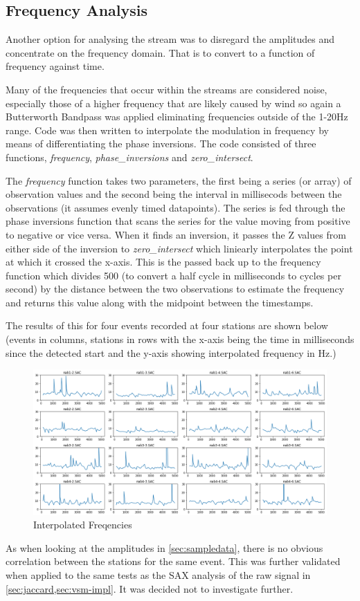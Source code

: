 \documentclass[../report.tex]{subfiles}
\begin{document}
\subsection{Frequency Analysis}
	Another option for analysing the stream was to disregard the amplitudes and concentrate on the frequency domain.  That is to convert to a function of frequency against time.
	
	Many of the frequencies that occur within the streams are considered noise, especially those of a higher frequency that are likely caused by wind so again a Butterworth Bandpass \citep{bandpass} was applied eliminating frequencies outside of the 1-20Hz range.  Code was then written to interpolate the modulation in frequency by means of differentiating the phase inversions.  The code consisted of three functions, \textit{frequency}, \textit{phase\_inversions} and \textit{zero\_intersect}.
	
	The \textit{frequency} function takes two parameters, the first being a series (or array) of observation values and the second being the interval in millisecods between the observations (it assumes evenly timed datapoints).  The series is fed through the phase inversions function that scans the series for the value moving from positive to negative or vice versa.  When it finds an inversion, it passes the Z values from either side of the inversion to \textit{zero\_intersect} which liniearly interpolates the point at which it crossed the x-axis.  This is the passed back up to the frequency function which divides 500 (to convert a half cycle in milliseconds to cycles per second) by the distance between the two observations to estimate the frequency and returns this value along with the midpoint between the timestamps.
	
	The results of this for four events recorded at four stations are shown below (events in columns, stations in rows with the x-axis being the time in milliseconds since the detected start and the y-axis showing interpolated frequency in Hz.)

\begin{figure}[H]
	\centering
	\includegraphics[width=1\linewidth]{img/freq_anal}
	\caption{Interpolated Freqencies}
	\label{fig:freq_anal}
\end{figure}

	As when looking at the amplitudes in \cref{sec:sampledata}, there is no obvious correlation between the stations for the same event.  This was further validated when applied to the same tests as the SAX analysis of the raw signal in \cref{sec:jaccard,sec:vsm-impl}. It was decided not to investigate further.   
\end{document}
